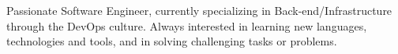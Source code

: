 

\begin{cvparagraph}

Passionate Software Engineer, currently specializing in Back-end/Infrastructure through the DevOps culture. Always interested in learning new languages, technologies and tools, and in solving challenging tasks or problems.
\end{cvparagraph}
